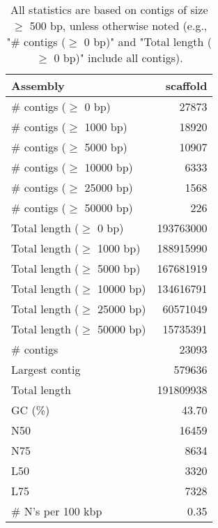 \documentclass[12pt,a4paper]{article}
\begin{document}
\begin{table}[ht]
\begin{center}
\caption{All statistics are based on contigs of size $\geq$ 500 bp, unless otherwise noted (e.g., "\# contigs ($\geq$ 0 bp)" and "Total length ($\geq$ 0 bp)" include all contigs).}
\begin{tabular}{|l*{1}{|r}|}
\hline
Assembly & scaffold \\ \hline
\# contigs ($\geq$ 0 bp) & 27873 \\ \hline
\# contigs ($\geq$ 1000 bp) & 18920 \\ \hline
\# contigs ($\geq$ 5000 bp) & 10907 \\ \hline
\# contigs ($\geq$ 10000 bp) & 6333 \\ \hline
\# contigs ($\geq$ 25000 bp) & 1568 \\ \hline
\# contigs ($\geq$ 50000 bp) & 226 \\ \hline
Total length ($\geq$ 0 bp) & 193763000 \\ \hline
Total length ($\geq$ 1000 bp) & 188915990 \\ \hline
Total length ($\geq$ 5000 bp) & 167681919 \\ \hline
Total length ($\geq$ 10000 bp) & 134616791 \\ \hline
Total length ($\geq$ 25000 bp) & 60571049 \\ \hline
Total length ($\geq$ 50000 bp) & 15735391 \\ \hline
\# contigs & 23093 \\ \hline
Largest contig & 579636 \\ \hline
Total length & 191809938 \\ \hline
GC (\%) & 43.70 \\ \hline
N50 & 16459 \\ \hline
N75 & 8634 \\ \hline
L50 & 3320 \\ \hline
L75 & 7328 \\ \hline
\# N's per 100 kbp & 0.35 \\ \hline
\end{tabular}
\end{center}
\end{table}
\end{document}
